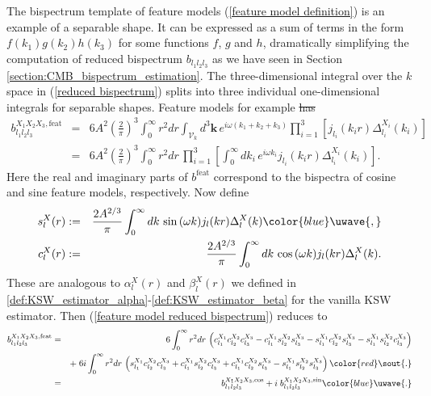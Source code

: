 \documentclass[a4paper,12pt,times,custombib,print,index]{Classes/PhDThesisPSnPDF} %
\providecommand{\DIFadd}[1]{{\protect\color{blue}\uwave{#1}}} %
\providecommand{\DIFdel}[1]{{\protect\color{red}\sout{#1}}}                      %
\providecommand{\DIFaddbegin}{} %
\providecommand{\DIFaddend}{} %
\providecommand{\DIFdelbegin}{} %
\providecommand{\DIFdelend}{} %
\newcommand{\DIFscaledelfig}{0.5}
\newlength{\DIFdelgraphicswidth} %
\newlength{\DIFdelgraphicsheight} %
\newcommand{\DIFaddincludegraphics}[2][]{{\color{blue}\fbox{\DIFOincludegraphics[#1]{#2}}}} %
\newcommand{\DIFdelincludegraphics}[2][]{%
\sbox{\DIFdelgraphicsbox}{\DIFOincludegraphics[#1]{#2}}%
\settoboxwidth{\DIFdelgraphicswidth}{\DIFdelgraphicsbox} %
\settoboxtotalheight{\DIFdelgraphicsheight}{\DIFdelgraphicsbox} %
\scalebox{\DIFscaledelfig}{%
\parbox[b]{\DIFdelgraphicswidth}{\usebox{\DIFdelgraphicsbox}\\[-\baselineskip] \rule{\DIFdelgraphicswidth}{0em}}\llap{\resizebox{\DIFdelgraphicswidth}{\DIFdelgraphicsheight}{%
\setlength{\unitlength}{\DIFdelgraphicswidth}%
\begin{picture}(1,1)%
\thicklines\linethickness{2pt} %
{\color[rgb]{1,0,0}\put(0,0){\framebox(1,1){}}}%
{\color[rgb]{1,0,0}\put(0,0){\line( 1,1){1}}}%
{\color[rgb]{1,0,0}\put(0,1){\line(1,-1){1}}}%
\end{picture}%
}\hspace*{3pt}}} %
} %
\DeclareRobustCommand{\DIFaddbegin}{\DIFOaddbegin \let\includegraphics\DIFaddincludegraphics} %
\DeclareRobustCommand{\DIFaddend}{\DIFOaddend \let\includegraphics\DIFOincludegraphics} %
\DeclareRobustCommand{\DIFdelbegin}{\DIFOdelbegin \let\includegraphics\DIFdelincludegraphics} %
\DeclareRobustCommand{\DIFdelend}{\DIFOaddend \let\includegraphics\DIFOincludegraphics} %
\begin{document}
The bispectrum template of feature models (\ref{feature model definition}) is an example of a separable shape. It can be expressed as a sum of terms in the form $f(k_1)g(k_2)h(k_3)$ for some functions $f$, $g$ and $h$, dramatically simplifying the computation of reduced bispectrum $b_{l_1 l_2 l_3}$ as we have seen in Section \ref{section:CMB_bispectrum_estimation}. The three-dimensional integral over the $k$ space in (\ref{reduced bispectrum}) splits into three individual one-dimensional integrals for separable shapes. Feature models for example \DIFdelbegin \DIFdel{has
}\DIFdelend \DIFaddbegin \DIFadd{have
}\DIFaddend \begin{eqnarray}
	b_{l_1 l_2 l_3}^{X_1 X_2 X_3,\text{feat}} &=& 6A^2 \left( \frac{2}{\pi} \right)^3 \int_0^\infty r^2 dr \int_{\mathcal{V}_k} d^3\mathbf{k}\, e^{i\omega (k_1 + k_2 + k_3)} \prod_{i=1}^{3} \left[ j_{l_i} (k_i r) \Delta_{l_i}^{X_i} (k_i) \right] \nonumber \\
	&=&  6A^2 \left( \frac{2}{\pi} \right)^3 \int_0^\infty r^2 dr \, \prod_{i=1}^{3} \left[ \int_0^\infty dk_i \, e^{i \omega k_i} j_{l_i} (k_i r) \Delta_{l_i}^{X_i} (k_i) \right]. \label{feature model reduced bispectrum}
\end{eqnarray}
Here the real and imaginary parts of $b^\text{feat}$ correspond to the bispectra of cosine and sine feature models, respectively. Now define
\begin{eqnarray}
	s_l^X(r) &:=& \frac{2A^{2/3}}{\pi} \int_0^\infty dk \, \sin\,(\omega k) j_l(kr) \Delta_l^X(k)\DIFaddbegin \DIFadd{, }\DIFaddend \\
	c_l^X(r) &:=& \frac{2A^{2/3}}{\pi} \int_0^\infty dk \, \cos\,(\omega k) j_l(kr) \Delta_l^X(k).
\end{eqnarray}
These are analogous to $\alpha_l^X(r)$ and $\beta_l^X(r)$ we defined in \eqref{def:KSW_estimator_alpha}-\eqref{def:KSW_estimator_beta} for the vanilla KSW estimator. Then (\ref{feature model reduced bispectrum}) reduces to
\begin{eqnarray}
	b_{l_1 l_2 l_3}^{X_1 X_2 X_3, \text{feat}} &=& 6 \int_0^\infty r^2 dr \, \left(c_{l_1}^{X_1} c_{l_2}^{X_2} c_{l_3}^{X_3} -  c_{l_1}^{X_1} s_{l_2}^{X_2} s_{l_3}^{X_3} -  s_{l_1}^{X_1} c_{l_2}^{X_2} s_{l_3}^{X_3} -  s_{l_1}^{X_1} s_{l_2}^{X_2} c_{l_3}^{X_3} \right)  \nonumber \\
	&\quad& +\; 6i  \int_0^\infty r^2 dr \, \left(s_{l_1}^{X_1}c_{l_2}^{X_2}c_{l_3}^{X_3} + c_{l_1}^{X_1}s_{l_2}^{X_2}c_{l_3}^{X_3} +  c_{l_1}^{X_1}c_{l_2}^{X_2}s_{l_3}^{X_3} -  s_{l_1}^{X_1}s_{l_2}^{X_2}s_{l_3}^{X_3} \right) 	\DIFdelbegin \DIFdel{. 	}\DIFdelend \nonumber \\
	&=& b_{l_1 l_2 l_3}^{X_1 X_2 X_3, \text{cos}} + i \; b_{l_1 l_2 l_3}^{X_1 X_2 X_3, \text{sin}}\DIFaddbegin \DIFadd{.
	}\DIFaddend \label{feature model reduced bispectrum sin and cos}
\end{eqnarray}
\end{document}
